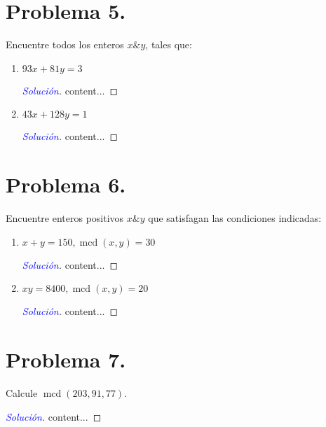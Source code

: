 \documentclass[a4paper,12pt]{article}
\newenvironment{solution}
  {\renewcommand\qedsymbol{$\square$}\begin{proof}[\textcolor{blue}{Solución}]}
  {\end{proof}}
\begin{document}
\section{Problema 5.} Encuentre todos los enteros $x \& y$, tales que:
\begin{enumerate}[label=\alph*.]
	\item $93 x+81 y=3$
	\begin{solution}
		content...
	\end{solution}
	\item $43 x+128 y=1$
	\begin{solution}
		content...
	\end{solution}
\end{enumerate}

\section{Problema 6.} Encuentre enteros positivos $x \& y$ que satisfagan las condiciones indicadas:
\begin{enumerate}[label=\alph*.]
	\item $x+y=150, \operatorname{mcd}(x, y)=30$
	\begin{solution}
		content...
	\end{solution}
	\item $x y=8400, \operatorname{mcd}(x, y)=20$
	\begin{solution}
		content...
	\end{solution}
\end{enumerate}

\section{Problema 7.} Calcule $\operatorname{mcd}(203,91,77)$.
\begin{solution}
	content...
\end{solution}

%
%
\end{document}
